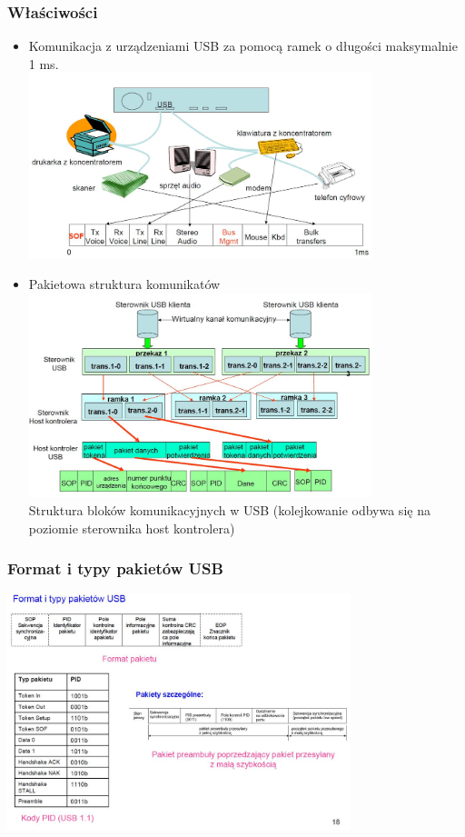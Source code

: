 	\subsubsection{Właściwości}
	\begin{itemize}
		\item Komunikacja z urządzeniami USB za pomocą ramek o długości maksymalnie 1 ms.\\
		\includegraphics[width=10cm]{./wyklady/USB_18_1.jpg}
		\newpage
		\item Pakietowa struktura komunikatów\\
		\includegraphics[width=10cm]{./wyklady/USB_19_1.jpg}\\
		Struktura bloków komunikacyjnych w USB (kolejkowanie odbywa się na poziomie sterownika host kontrolera)
	\end{itemize}
	\subsubsection{Format i typy pakietów USB}
	\includegraphics[width=10cm]{./wyklady/USB_20_1.jpg}
